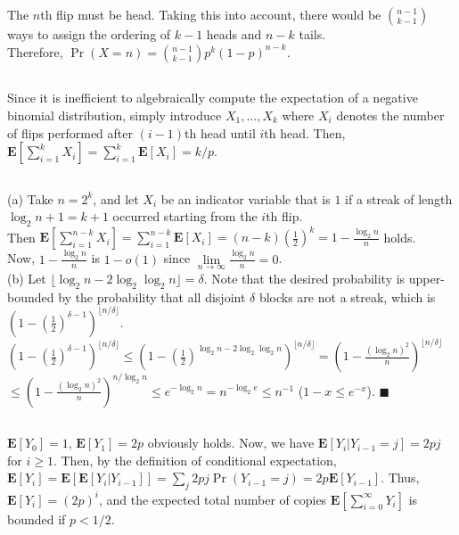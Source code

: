 \documentclass{article}
\begin{document}
\subsection{}
The $n$th flip must be head. Taking this into account, there would be $\binom{n-1}{k-1}$ ways to assign the ordering of $k-1$ heads and $n-k$ tails.\\
Therefore, $\Pr(X=n)=\binom{n-1}{k-1}p^k(1-p)^{n-k}$.
\subsection{}
Since it is inefficient to algebraically compute the expectation of a negative binomial distribution,
simply introduce $X_1,...,X_k$ where $X_i$ denotes the number of flips performed after $(i-1)$th head until $i$th head.
Then, $\textbf{E}[\sum\limits_{i=1}^kX_i]=\sum\limits_{i=1}^k\textbf{E}[X_i]=k/p$.
\subsection{}
(a) Take $n=2^k$, and let $X_i$ be an indicator variable that is $1$ if a streak of length $\log_2n+1=k+1$ occurred starting from the $i$th flip.\\
Then $\textbf{E}[\sum\limits_{i=1}^{n-k}X_i]=\sum\limits_{i=1}^{n-k}\textbf{E}[X_i]=(n-k)(\frac{1}{2})^k=1-\frac{\log_2n}{n}$ holds.\\
Now, $1-\frac{\log_2n}{n}$ is $1-o(1)$ since $\lim\limits_{n\rightarrow\infty}\frac{\log_2n}{n}=0$.\\
(b) Let $\lfloor \log_2 n - 2\log_2\log_2 n \rfloor=\delta$.
Note that the desired probability is upper-bounded by the probability that all disjoint $\delta$ blocks are not a streak, which is $(1-(\frac{1}{2})^{\delta-1})^{\lfloor n/\delta \rfloor}$.\\
$(1-(\frac{1}{2})^{\delta-1})^{\lfloor n/\delta \rfloor}\leq(1-(\frac{1}{2})^{\log_2n-2\log_2\log_2n})^{\lfloor n/\delta \rfloor}=(1-\frac{(\log_2n)^2}{n})^{\lfloor n/\delta \rfloor}$\\
$\leq(1-\frac{(\log_2n)^2}{n})^{n/\log_2n}\leq e^{-\log_2n}=n^{-\log_2e}\leq n^{-1}$ ($1-x\leq e^{-x}$). $\blacksquare$
\subsection{}
$\textbf{E}[Y_0]=1$, $\textbf{E}[Y_1]=2p$ obviously holds. Now, we have $\textbf{E}[Y_i|Y_{i-1}=j]=2pj$ for $i\geq 1$.
Then, by the definition of conditional expectation, $\textbf{E}[Y_i]=\textbf{E}[\textbf{E}[Y_i|Y_{i-1}]]=\sum_j2pj\Pr(Y_{i-1}=j)=2p\textbf{E}[Y_{i-1}]$.
Thus, $\textbf{E}[Y_i]=(2p)^i$, and the expected total number of copies $\textbf{E}[\sum\limits_{i=0}^\infty Y_i]$ is bounded if $p<1/2$.
\end{document}
